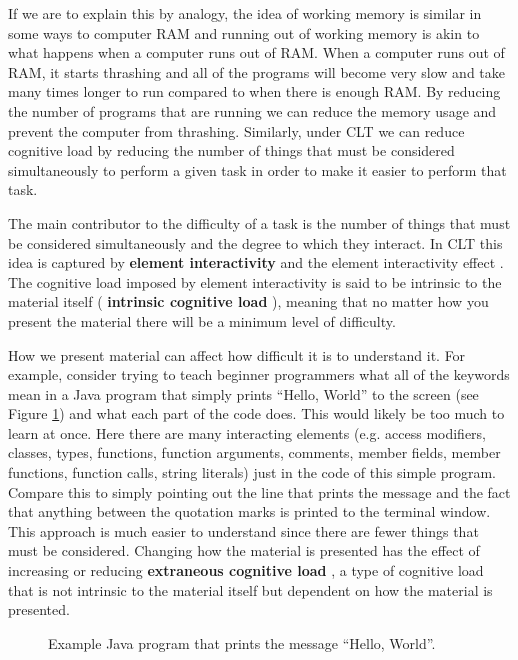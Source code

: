 \documentclass[12pt]{article}
\theoremstyle{grammarstyle}
\newcommand{\keyword}[1]{%
    \textbf{#1}%
}
\begin{document}
If we are to explain this by analogy, the idea of working memory is similar in some ways to computer RAM and running out of working memory is akin to what happens when a computer runs out of RAM. When a computer runs out of RAM, it starts thrashing and all of the programs will become very slow and take many times longer to run compared to when there is enough RAM. By reducing the number of programs that are running we can reduce the memory usage and prevent the computer from thrashing. Similarly, under CLT we can reduce cognitive load by reducing the number of things that must be considered simultaneously to perform a given task in order to make it easier to perform that task. 

The main contributor to the difficulty of a task is the number of things that must be considered simultaneously and the degree to which they interact. In CLT this idea is captured by \keyword{element interactivity} and the element interactivity effect \citep{sweller2011element}. The cognitive load imposed by element interactivity is said to be intrinsic to the material itself (\keyword{intrinsic cognitive load}), meaning that no matter how you present the material there will be a minimum level of difficulty.

How we present material can affect how difficult it is to understand it. For example, consider trying to teach beginner programmers what all of the keywords mean in a Java program that simply prints ``Hello, World'' to the screen (see Figure \ref{fig:java_hello_world}) and what each part of the code does. This would likely be too much to learn at once. Here there are many interacting elements (e.g. access modifiers, classes, types, functions, function arguments, comments, member fields, member functions, function calls, string literals) just in the code of this simple program. Compare this to simply pointing out the line that prints the message and the fact that anything between the quotation marks is printed to the terminal window. This approach is much easier to understand since there are fewer things that must be considered. Changing how the material is presented has the effect of increasing or reducing \keyword{extraneous cognitive load}, a type of cognitive load that is not intrinsic to the material itself but dependent on how the material is presented. 

\begin{figure}
    \centering
     \lstset{xleftmargin=20pt}
    
    \caption{Example Java program that prints the message ``Hello, World''.}
    \label{fig:java_hello_world}
\end{figure}
\end{document}
